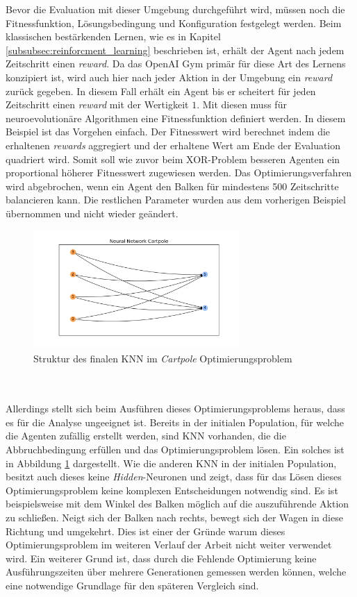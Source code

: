 Bevor die Evaluation mit dieser Umgebung durchgeführt wird, müssen noch die Fitnessfunktion, Lösungsbedingung und Konfiguration festgelegt werden. Beim klassischen bestärkenden Lernen, wie es in Kapitel \ref{subsubsec:reinforcment_learning} beschrieben ist, erhält der Agent nach jedem Zeitschritt einen \emph{reward}. Da das OpenAI Gym primär für diese Art des Lernens konzipiert ist, wird auch hier nach jeder Aktion in der Umgebung ein \emph{reward} zurück gegeben. In diesem Fall erhält ein Agent bis er scheitert für jeden Zeitschritt einen \emph{reward} mit der Wertigkeit $1$. Mit diesen muss für neuroevolutionäre Algorithmen eine Fitnessfunktion definiert werden. In diesem Beispiel ist das Vorgehen einfach. Der Fitnesswert wird berechnet indem die erhaltenen \emph{rewards} aggregiert und der erhaltene Wert am Ende der Evaluation quadriert wird. Somit soll wie zuvor beim XOR-Problem besseren Agenten ein proportional höherer Fitnesswert zugewiesen werden. Das Optimierungsverfahren wird abgebrochen, wenn ein Agent den Balken für mindestens 500 Zeitschritte balancieren kann. Die restlichen Parameter wurden aus dem vorherigen Beispiel übernommen und nicht wieder geändert.
\begin{figure}[!h]
	\centering
	\includegraphics[width=0.7\textwidth]{./img/pole_balancing_single_core/cartpole_neuroal_network.pdf} 
	\caption{Struktur des finalen KNN im \emph{Cartpole} Optimierungsproblem}
	\label{fig:cartpole_neural_network}
\end{figure}
\\\\
Allerdings stellt sich beim Ausführen dieses Optimierungsproblems heraus, dass es für die Analyse ungeeignet ist. Bereits in der initialen Population, für welche die Agenten zufällig erstellt werden, sind \ac{KNN} vorhanden, die die Abbruchbedingung erfüllen und das Optimierungsproblem lösen. Ein solches ist in Abbildung \ref{fig:cartpole_neural_network} dargestellt. Wie die anderen \ac{KNN} in der initialen Population, besitzt auch dieses keine \emph{Hidden}-Neuronen und zeigt, dass für das Lösen dieses Optimierungsproblem keine komplexen Entscheidungen notwendig sind. Es ist beispielsweise mit dem Winkel des Balken möglich auf die auszuführende Aktion zu schließen. Neigt sich der Balken nach rechts, bewegt sich der Wagen in diese Richtung und umgekehrt. Dies ist einer der Gründe warum dieses Optimierungsproblem im weiteren Verlauf der Arbeit nicht weiter verwendet wird. Ein weiterer Grund ist, dass durch die Fehlende Optimierung keine Ausführungszeiten über mehrere Generationen gemessen werden können, welche eine notwendige Grundlage für den späteren Vergleich sind.

